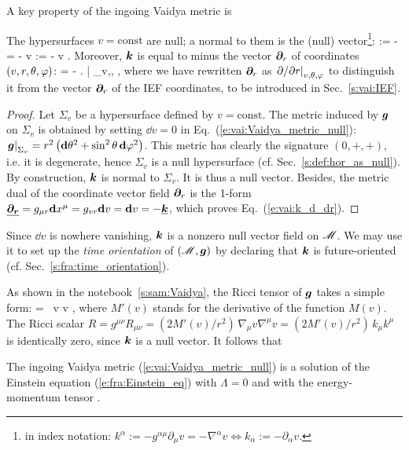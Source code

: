 A key property of the ingoing Vaidya metric is
\begin{greybox}
The hypersurfaces $v = \mathrm{const}$ are null; a normal to them is the (null)
vector\footnote{in index notation: $k^\alpha := - g^{\alpha\mu} \partial_\mu v = - \nabla^\alpha v \iff
k_\alpha := - \partial_\alpha v $.}:
\be \label{e:vai:def_k}
     := -  = - \vw{\nabla} v \quad\iff\quad
     := - \dd v .
\ee
Moreover, $\bm{k}$ is equal to minus the vector $\bm{\partial}_r$ of coordinates
$(v,r,\theta,\varphi)$:
\be \label{e:vai:k_d_dr}
     = - \left.  \right| _{v,\th,\ph} ,
\ee
where we have rewritten $\bm{\partial}_r$ as $\left. {\partial }/{\partial r} \right| _{v,\theta,\varphi}$
to distinguish it from the vector $\bm{\partial}_r$ of the IEF coordinates, to be
introduced in Sec.~\ref{s:vai:IEF}.
\end{greybox}
\begin{proof}
Let $\Sigma_v$ be a hypersurface defined by $v = \mathrm{const}$.
The metric induced by $\bm{g}$ on $\Sigma_v$
is obtained by setting $\dd v = 0$ in Eq.~(\ref{e:vai:Vaidya_metric_null}):
$\left.\bm{g}\right| _{\Sigma_v} = r^2 \left( \mathbf{d}\theta^2 + \sin^2\theta\, \mathbf{d}\varphi^2 \right)$.
This metric has clearly the signature $(0, +, +)$, i.e. it is degenerate, hence
$\Sigma_v$ is a null hypersurface (cf. Sec.~\ref{s:def:hor_as_null}).
By construction, $\bm{k}$ is normal to $\Sigma_v$. It is thus a null vector.
Besides, the metric dual of
the coordinate vector field $\bm{\partial}_r$ is the 1-form
$\underline{\bm{\bm{\partial}_r}} = g_{\mu r}\mathbf{d} x^\mu = g_{vr} \mathbf{d} v = \mathbf{d} v = - \underline{\bm{k}}$,
which proves Eq.~(\ref{e:vai:k_d_dr}).
\end{proof}

Since $\dd v$ is nowhere vanishing, $\bm{k}$ is a nonzero null vector field on $\mathscr{M}$.
We may use it to set up the \emph{time orientation} of $(\mathscr{M},\bm{g})$
by declaring that $\bm{k}$ is future-oriented (cf. Sec.~\ref{s:fra:time_orientation}).

As shown in the notebook~\ref{s:sam:Vaidya},
the Ricci tensor of $\bm{g}$ takes a simple form:
\be \label{e:vai:Ricci_tensor}
     = \, \dd v \otimes \dd v ,
\ee
where $M'(v)$ stands for the derivative of the function $M(v)$.
The Ricci scalar $R = g^{\mu\nu} R_{\mu\nu} = (2M'(v)/r^2) \, \nabla_\mu v \nabla^\mu v =  (2M'(v)/r^2) \, k_\mu k^\mu$ is identically zero, since $\bm{k}$ is a null vector.
It follows that
\begin{greybox}
The ingoing Vaidya metric (\ref{e:vai:Vaidya_metric_null}) is a solution
of the Einstein equation (\ref{e:fra:Einstein_eq})
with $\Lambda = 0$ and with the energy-momentum tensor
\be \label{e:vai:ener_mom_tensor}
    .
\ee
\end{greybox}

